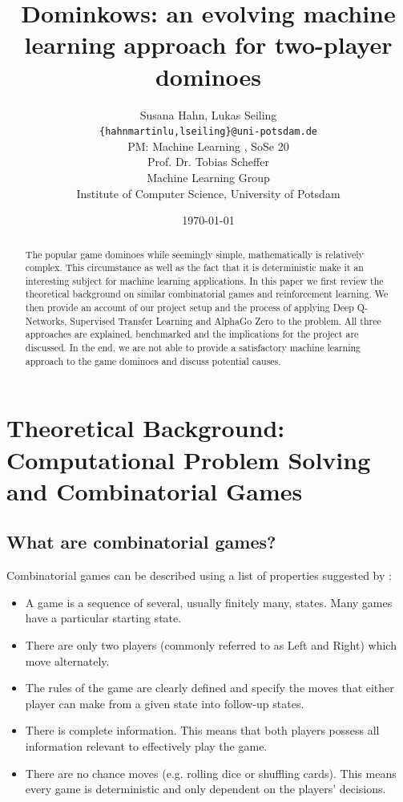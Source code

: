 \documentclass[12pt,a4paper]{article}
\title{Dominkows: an evolving machine learning approach for two-player dominoes}
\author{Susana Hahn, Lukas Seiling\\
\texttt{\{hahnmartinlu,lseiling\}@uni-potsdam.de} \\
PM: Machine Learning , SoSe 20 \\
Prof. Dr. Tobias Scheffer \\
Machine Learning Group \\
Institute of Computer Science, University of Potsdam}
\date{\today}
\begin{document}
\newgeometry{}
\maketitle
\thispagestyle{empty}
\begin{abstract}
The popular game dominoes while seemingly simple, mathematically is relatively complex. This circumstance as well as the fact that it is deterministic make it an interesting subject for machine learning applications. In this paper we first review the theoretical background on similar combinatorial games and reinforcement learning. We then provide an account of our project setup and the process of applying Deep Q-Networks, Supervised Transfer Learning and AlphaGo Zero to the problem. All three approaches are explained, benchmarked and the implications for the project are discussed. In the end, we are not able to provide a satisfactory machine learning approach to the game dominoes and discuss potential causes.
\end{abstract}
\newpage
\thispagestyle{empty}
\tableofcontents
\newpage
\restoregeometry
\setcounter{page}{3}
\section{Theoretical Background: Computational Problem Solving and Combinatorial Games}
\subsection{What are combinatorial games?}
Combinatorial games can be described using a list of properties suggested by \citet{berlekamp_winning_2001}:
\begin{itemize}
\setlength\itemsep{0.01em}
  \item A game is a sequence of several, usually finitely many, states. Many games have a particular starting state.
  \item There are only two players (commonly referred to as Left and Right) which move alternately.
  \item The rules of the game are clearly defined and specify the moves that either player can make from a given state into follow-up states.
  \item There is complete information. This means that both players possess all information relevant to effectively play the game. 
  \item There are no chance moves (e.g. rolling dice or shuffling cards). This means every game is deterministic and only dependent on the players’ decisions.
\end{itemize}
\end{document}

